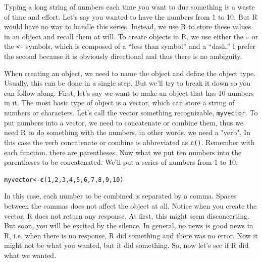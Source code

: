 \documentclass{tufte-handout}\usepackage[]{graphicx}\usepackage[]{xcolor}
\makeatletter
\newcommand{\hlnum}[1]{\textcolor[rgb]{0.686,0.059,0.569}{#1}}%
\newcommand{\hlstd}[1]{\textcolor[rgb]{0.345,0.345,0.345}{#1}}%
\newcommand{\hlkwb}[1]{\textcolor[rgb]{0.69,0.353,0.396}{#1}}%
\newcommand{\hlkwd}[1]{\textcolor[rgb]{0.737,0.353,0.396}{\textbf{#1}}}%
\newenvironment{kframe}{%
 \def\at@end@of@kframe{}%
 \ifinner\ifhmode%
  \def\at@end@of@kframe{\end{minipage}}%
  \begin{minipage}{\columnwidth}%
 \fi\fi%
 \def\FrameCommand##1{\hskip\@totalleftmargin \hskip-\fboxsep
 \colorbox{shadecolor}{##1}\hskip-\fboxsep
     \hskip-\linewidth \hskip-\@totalleftmargin \hskip\columnwidth}%
 \MakeFramed {\advance\hsize-\width
   \@totalleftmargin\z@ \linewidth\hsize
   \@setminipage}}%
 {\par\unskip\endMakeFramed%
 \at@end@of@kframe}
\newenvironment{knitrout}{}{} %
\makeatother
\begin{document}
Typing a long string of numbers each time you want to due something is a waste of time and effort. Let's say you wanted to have the numbers from 1 to 10. But R would have no way to handle this series. Instead, we use R to store these values in an object and recall them at will. To create objects in R, we use either the \texttt{=} or the \texttt{<-} symbols, which is composed of a ``less than symbol'' and a ``dash.'' I prefer the second because it is obviously directional and thus there is no ambiguity.

When creating an object, we need to name the object and define the object type. Usually, this can be done in a single step. But we'll try to break it down so you can follow along. First, let's say we want to make an object that has 10 numbers in it. The most basic type of object is a vector, which can store a string of numbers or characters. Let's call the vector something recognizable, \texttt{myvector}. To put numbers into a vector, we need to concatenate or combine them, thus we need R to do something with the numbers, in other words, we need a "verb". In this case the verb concatenate or combine is abbreviated as \texttt{c()}. Remember with each function, there are parentheses. Now what we put ten numbers into the parentheses to be concatenated. We'll put a series of numbers from 1 to 10. 

\begin{knitrout}
\color{fgcolor}\begin{kframe}
\begin{alltt}
\hlstd{myvector} \hlkwb{<-} \hlkwd{c}\hlstd{(}\hlnum{1}\hlstd{,} \hlnum{2}\hlstd{,} \hlnum{3}\hlstd{,} \hlnum{4}\hlstd{,} \hlnum{5}\hlstd{,} \hlnum{6}\hlstd{,} \hlnum{7}\hlstd{,} \hlnum{8}\hlstd{,} \hlnum{9}\hlstd{,} \hlnum{10}\hlstd{)}
\end{alltt}
\end{kframe}
\end{knitrout}

In this case, each number to be combined is separated by a comma. Spaces between the commas does not affect the object at all. Notice when you create the vector, R does not return any response. At first, this might seem disconcerting. But soon, you will be excited by the silence. In general, no news is good news in R, i.e. when there is no response, R did something and there was no error. Now it might not be what you wanted, but it did something. So, now let's see if R did what we wanted. 
\end{document}
